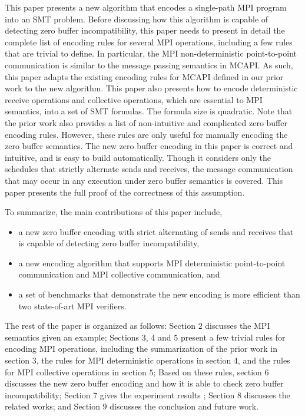 This paper presents a new algorithm that encodes a single-path MPI program into an SMT problem. 
Before discussing how this algorithm is capable of detecting zero buffer incompatibility, this paper needs to present in detail the complete list of encoding rules for several MPI operations, including a few rules that are trivial to define.  In particular, the MPI non-deterministic point-to-point communication is similar to the message passing semantics in MCAPI. As such, this paper adapts the existing encoding rules for MCAPI defined in our prior work \cite{DBLP:conf/kbse/HuangMM13} to the new algorithm. This paper also presents how to encode deterministic receive operations and collective operations, which are essential to MPI semantics, into a set of SMT formulas. The formula size is quadratic. Note that the prior work \cite{DBLP:conf/kbse/HuangMM13} also provides a list of non-intuitive and complicated zero buffer encoding rules. However, these rules are only useful for manually encoding the zero buffer semantics. The new zero buffer encoding in this paper is correct and intuitive, and is easy to build automatically. Though it considers only the schedules that strictly alternate sends and receives, the message communication that may occur in any execution under zero buffer semantics is covered. This paper presents the full proof of the correctness of this assumption.

To summarize, the main contributions of this paper include,
\begin{itemize}
\item a new zero buffer encoding with strict alternating of sends and receives that is capable of detecting zero buffer incompatibility, 
\item a new encoding algorithm that supports MPI deterministic point-to-point communication and MPI collective communication, and
\item a set of benchmarks that demonstrate the new encoding is more efficient than two state-of-art MPI verifiers.
\end{itemize}

The rest of the paper is organized as follows: Section $2$ discusses the MPI semantics given an example; Sections $3$, $4$ and $5$ present a few trivial rules for encoding MPI operations, including the summarization of the prior work \cite{DBLP:conf/kbse/HuangMM13} in section $3$, the rules for MPI deterministic operations in section $4$, and the rules for MPI collective operations in section $5$; Based on these rules, section $6$ discusses the new zero buffer encoding and how it is able to check zero buffer incompatibility; Section $7$ gives the experiment results ; Section $8$ discusses the related works; and Section $9$ discusses the conclusion and future work.

\examplefigone


           